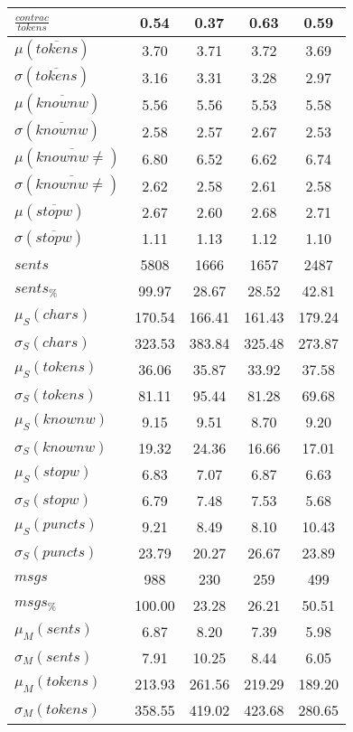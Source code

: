 \begin{table}[h!]
\begin{center}
\begin{tabular}{| l || c | c | c | c |}
$\frac{contrac}{tokens}$ & 0.54  & 0.37  & 0.63  & 0.59 \\\hline\hline
$\mu(\overline{tokens})$ & 3.70  & 3.71  & 3.72  & 3.69 \\
$\sigma(\overline{tokens})$ & 3.16  & 3.31  & 3.28  & 2.97 \\\hline
$\mu(\overline{knownw})$ & 5.56  & 5.56  & 5.53  & 5.58 \\
$\sigma(\overline{knownw})$ & 2.58  & 2.57  & 2.67  & 2.53 \\\hline
$\mu(\overline{knownw \neq})$ & 6.80  & 6.52  & 6.62  & 6.74 \\
$\sigma(\overline{knownw \neq})$ & 2.62  & 2.58  & 2.61  & 2.58 \\\hline
$\mu(\overline{stopw})$ & 2.67  & 2.60  & 2.68  & 2.71 \\
$\sigma(\overline{stopw})$ & 1.11  & 1.13  & 1.12  & 1.10 \\\hline\hline
$sents$ & 5808  & 1666  & 1657  & 2487 \\
$sents_{\%}$ & 99.97  & 28.67  & 28.52  & 42.81 \\\hline
$\mu_S(chars)$ & 170.54  & 166.41  & 161.43  & 179.24 \\
$\sigma_S(chars)$ & 323.53  & 383.84  & 325.48  & 273.87 \\\hline
$\mu_S(tokens)$ & 36.06  & 35.87  & 33.92  & 37.58 \\
$\sigma_S(tokens)$ & 81.11  & 95.44  & 81.28  & 69.68 \\\hline
$\mu_S(knownw)$ & 9.15  & 9.51  & 8.70  & 9.20 \\
$\sigma_S(knownw)$ & 19.32  & 24.36  & 16.66  & 17.01 \\\hline
$\mu_S(stopw)$ & 6.83  & 7.07  & 6.87  & 6.63 \\
$\sigma_S(stopw)$ & 6.79  & 7.48  & 7.53  & 5.68 \\\hline
$\mu_S(puncts)$ & 9.21  & 8.49  & 8.10  & 10.43 \\
$\sigma_S(puncts)$ & 23.79  & 20.27  & 26.67  & 23.89 \\\hline\hline
$msgs$ & 988  & 230  & 259  & 499 \\
$msgs_{\%}$ & 100.00  & 23.28  & 26.21  & 50.51 \\\hline
$\mu_M(sents)$ & 6.87  & 8.20  & 7.39  & 5.98 \\
$\sigma_M(sents)$ & 7.91  & 10.25  & 8.44  & 6.05 \\\hline
$\mu_M(tokens)$ & 213.93  & 261.56  & 219.29  & 189.20 \\
$\sigma_M(tokens)$ & 358.55  & 419.02  & 423.68  & 280.65 \\\hline

\end{tabular}
\end{center}
\end{table}
